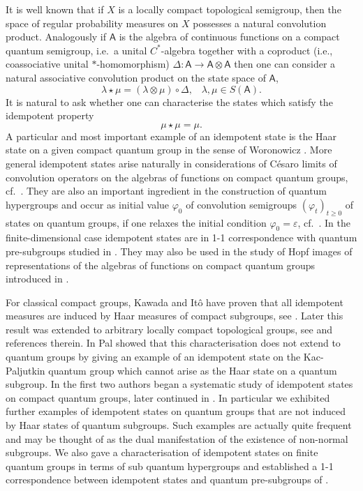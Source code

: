 \documentclass[12pt]{amsart}
\theoremstyle{definition}
\theoremstyle{remark}
\numberwithin{equation}{section}
\begin{document}
It is well known that if $X$ is a locally compact topological semigroup, then the space of regular probability measures on $X$ possesses a natural convolution product. Analogously if ${\mathsf{A}}$ is the algebra of continuous functions on a compact quantum semigroup, i.e.\ a unital $C^*$-algebra together with a coproduct (i.e., coassociative unital $*$-homomorphism) $ \Delta: {\mathsf{A}} \to {\mathsf{A}} \otimes {\mathsf{A}}$ then one can consider a natural associative convolution product on the state space of ${\mathsf{A}}$,
\[ \lambda \star \mu = (\lambda \otimes \mu)\circ \Delta, \;\;\; \lambda, \mu \in S({\mathsf{A}}).\]
It is natural to ask whether one can characterise the states which satisfy the idempotent property
\[ \mu \star \mu = \mu.\]
A particular and most important example of an idempotent state is the Haar state on a given compact quantum group 
in the sense of Woronowicz \cite{woronowicz98}. More general idempotent states arise naturally in considerations 
of C\'esaro limits of convolution operators on the algebras of functions on compact quantum groups, cf.\ 
\cite{franz+skalski08}. They are also an important ingredient in the construction of quantum hypergroups 
\cite{chapovsky+vainerman99} and occur as initial value $\varphi_0$ of convolution semigroups $(\varphi_t)_{t\ge 
0}$ of states on quantum groups, if one relaxes the initial condition $\varphi_0=\varepsilon$, cf.\ 
\cite{franz+schuermann00}. In the finite-dimensional case idempotent states are in 1-1 correspondence with 
quantum pre-subgroups studied in \cite{baaj+blanchard+skandalis99}. They may also be used in the study of Hopf 
images of representations of the algebras of functions on compact quantum groups introduced in 
\cite{Banica+Bichon10}.

For classical compact groups, Kawada and It\^o have proven that all idempotent measures are induced by Haar measures of compact
subgroups, see \cite[theorem 3]{kawada+ito40}. Later this result was extended to arbitrary locally compact topological groups,
see \cite{heyer77} and references therein. In \cite{pal96} Pal showed that this characterisation does not extend to quantum
groups by giving an example of an idempotent state on the Kac-Paljutkin quantum group which cannot arise as the Haar state on a
quantum subgroup. In \cite{franz+skalski08a} the first two authors began a systematic study of idempotent states on compact
quantum groups, later continued in \cite{franz+skalski09}. In particular we exhibited further examples of idempotent states on quantum groups that are not induced by Haar
states of quantum subgroups. Such examples are actually quite frequent and may be thought of as the dual manifestation of the
existence of non-normal subgroups. We also gave a characterisation of idempotent states on finite quantum groups in terms of sub
quantum hypergroups and established a 1-1 correspondence between idempotent states and quantum pre-subgroups of \cite{baaj+blanchard+skandalis99}.
\end{document}
